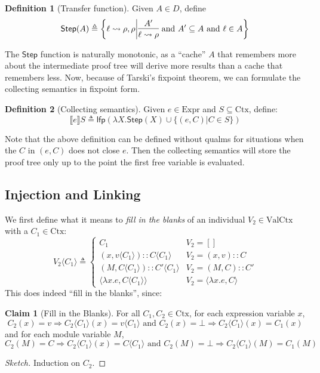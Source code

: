 \documentclass{article}
\theoremstyle{definition}
\newtheorem{definition}{Definition}[section]
\newtheorem{clm}{Claim}[section]
\newcommand*{\cons}{::}
\newcommand*{\Expr}{\text{Expr}}
\newcommand*{\Ctx}{\text{Ctx}}
\newcommand*{\Value}{\text{Val}}
\newcommand*{\lfp}{\mathsf{lfp}}
\newcommand*{\semarrow}{\rightsquigarrow}
\newcommand*{\sembracket}[1]{\lBrack{#1}\rBrack}
\newcommand*{\inject}[2]{{#2}\langle{#1}\rangle}
\begin{document}
\begin{definition}[Transfer function]
  Given $A\in D$, define
  \[
    \mathsf{Step}(A)\triangleq
    \left\{\ell\semarrow\rho, \rho\middle|
    \begin{prooftree}[center=true]
      \hypo{A'}\infer1{\ell\semarrow\rho}
    \end{prooftree}\text{ and }
    A'\subseteq A\text{ and }\ell\in A
    \right\}
  \]
\end{definition}

The $\mathsf{Step}$ function is naturally monotonic, as a ``cache'' $A$ that remembers more about the intermediate proof tree will derive more results than a cache that remembers less.
Now, because of Tarski's fixpoint theorem, we can formulate the collecting semantics in fixpoint form.
\begin{definition}[Collecting semantics]
  Given $e\in\Expr$ and $S\subseteq\Ctx$, define:
  \[
    \sembracket{e}S\triangleq\lfp(\lambda X.\mathsf{Step}(X)\cup\{(e,C)|C\in S\})
  \]
\end{definition}
Note that the above definition can be defined without qualms for situations when the $C$ in $(e,C)$ does not close $e$.
Then the collecting semantics will store the proof tree only up to the point the first free variable is evaluated.

\subsection{Injection and Linking}
We first define what it means to \emph{fill in the blanks} of an individual $V_2\in\Value\Ctx$ with a $C_1\in\Ctx$:
\[
  \inject{C_{1}}{V_{2}}\triangleq
  \begin{cases}
    C_1                                           & V_{2}=[]                        \\
    (x, \inject{C_1}{v})\cons\inject{C_{1}}{C}    & V_{2}=(x,v)\cons C              \\
    (M, \inject{C_{1}}{C})\cons\inject{C_{1}}{C'} & V_{2}=(M,C)\cons C'             \\
    \langle\lambda x.e,\inject{C_1}{C}\rangle     & V_2=\langle\lambda x.e,C\rangle
  \end{cases}
\]
This does indeed ``fill in the blanks'', since:
\begin{clm}[Fill in the Blanks]
  For all $C_1,C_2\in\Ctx$, for each expression variable $x$,
  \[
    C_2(x)=v\Rightarrow\inject{C_1}{C_2}(x)=\inject{C_1}{v}\text{ and }C_2(x)=\bot\Rightarrow\inject{C_1}{C_2}(x)=C_1(x)
  \]
  and for each module variable $M$,
  \[
    C_2(M)=C\Rightarrow\inject{C_1}{C_2}(x)=\inject{C_1}{C}\text{ and }C_2(M)=\bot\Rightarrow\inject{C_1}{C_2}(M)=C_1(M)
  \]
\end{clm}
\begin{proof}[Sketch]
  Induction on $C_2$.
\end{proof}
\end{document}
